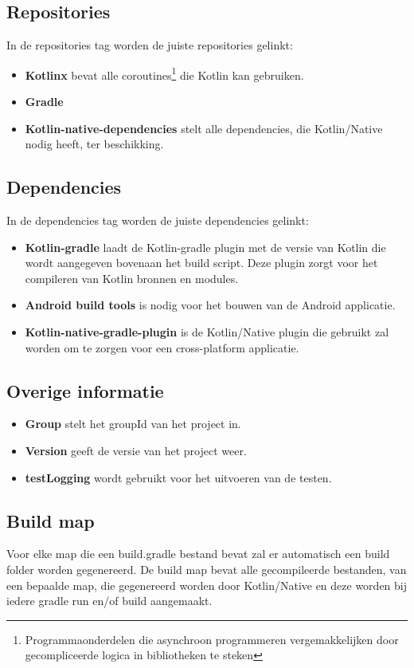 \subsection{Repositories}
In de repositories tag worden de juiste repositories gelinkt:
\begin{itemize}
	\item \textbf{Kotlinx} bevat alle coroutines\footnote{Programmaonderdelen die asynchroon programmeren vergemakkelijken door gecompliceerde logica in bibliotheken te steken} die Kotlin kan gebruiken.
	\item \textbf{Gradle}
	\item \textbf{Kotlin-native-dependencies} stelt alle dependencies, die Kotlin/Native nodig heeft, ter beschikking.
\end{itemize}

\subsection{Dependencies}
In de dependencies tag worden de juiste dependencies gelinkt:
\begin{itemize}
	\item \textbf{Kotlin-gradle} laadt de Kotlin-gradle plugin met de versie van Kotlin die wordt aangegeven bovenaan het build script. Deze plugin zorgt voor het compileren van Kotlin bronnen en modules.
	\item \textbf{Android build tools} is nodig voor het bouwen van de Android applicatie.
	\item \textbf{Kotlin-native-gradle-plugin} is de Kotlin/Native plugin die gebruikt zal worden om te zorgen voor een cross-platform applicatie.
\end{itemize}

\subsection{Overige informatie}
\label{sec:overige}
\begin{itemize}
	\item \textbf{Group} stelt het groupId van het project in.
	\item \textbf{Version} geeft de versie van het project weer.
	\item \textbf{testLogging} wordt gebruikt voor het uitvoeren van de testen.
\end{itemize}

\subsection{Build map}
Voor elke map die een build.gradle bestand bevat zal er automatisch een build folder worden gegenereerd. De build map bevat alle gecompileerde bestanden, van een bepaalde map, die gegenereerd worden door Kotlin/Native en deze worden bij iedere gradle run en/of build aangemaakt.


